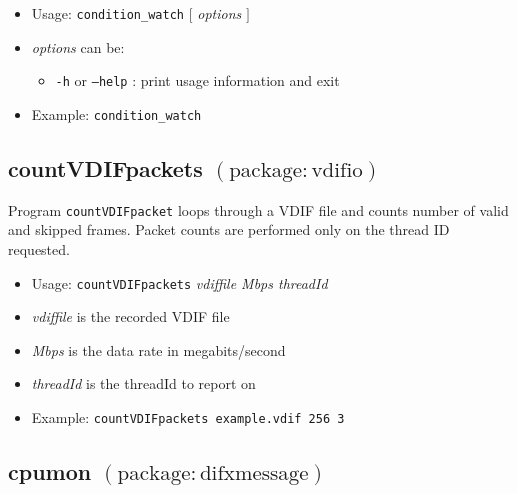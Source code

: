 \begin{itemize}
\item[] Usage: {\tt condition\_watch} $[$ {\em options} $]$
\item[] {\em options} can be:
\begin{itemize}
\item[] {\tt -h} or {\tt --help} : print usage information and exit
\end{itemize}
\item[] Example: {\tt condition\_watch}
\end{itemize}








\subsection{countVDIFpackets {\small $\mathrm{(package: vdifio)}$} \label{sec:countVDIFpackets}}

Program {\tt countVDIFpacket} loops through a VDIF file and counts number of valid and skipped frames.
Packet counts are performed only on the thread ID requested.

\begin{itemize}
\item[] Usage: {\tt countVDIFpackets} {\em vdiffile Mbps threadId}

\item[] {\em vdiffile} is the recorded VDIF file
\item[] {\em Mbps} is the data rate in megabits/second
\item[] {\em threadId} is the threadId to report on

\item[] Example: {\tt countVDIFpackets example.vdif 256 3}
\end{itemize}









\subsection{cpumon {\small $\mathrm{(package: difxmessage)}$}} \label{sec:cpumon} 

